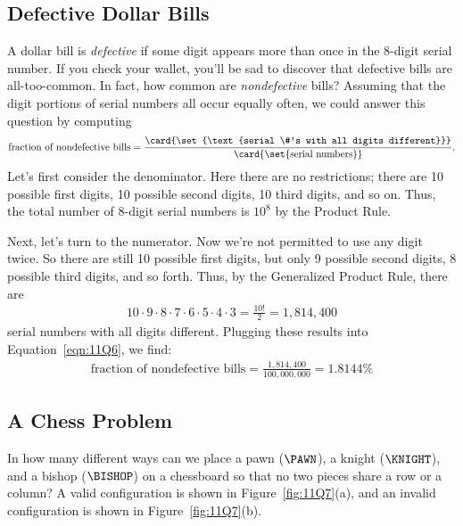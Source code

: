 \subsection{Defective Dollar Bills}

A dollar bill is \emph{defective} if some digit appears
more than once in the 8-digit serial number.  If you check your
wallet, you'll be sad to discover that defective bills are
all-too-common.  In fact, how common are \emph{nondefective} bills?
Assuming that the digit portions of serial numbers all occur equally
often, we could answer this question by computing
%
\begin{equation}\label{eqn:11Q6}
\text{fraction of nondefective bills}
     = \frac{ \card{\set{\text{serial \#'s with all digits different}}} }
             { \card{\set{\text{serial numbers}}} }.
\end{equation}
%
Let's first consider the denominator.  Here there are no restrictions;
there are 10 possible first digits, 10 possible second digits, 10
third digits, and so on.  Thus, the total number of 8-digit serial
numbers is $10^8$ by the Product Rule.

Next, let's turn to the numerator.  Now we're not permitted to use any
digit twice.  So there are still 10 possible first digits, but only 9
possible second digits, 8 possible third digits, and so forth.  Thus, by
the Generalized Product Rule, there are
%
\begin{align*}
10 \cdot 9 \cdot 8 \cdot 7 \cdot 6 \cdot 5 \cdot 4 \cdot 3
     = \frac{10!}{2} %
     = 1{,}814{,}400
\end{align*}
%
serial numbers with all digits different.  Plugging these results into
Equation~\ref{eqn:11Q6}, we find:
%
\begin{align*}
\text{fraction of nondefective bills}
     = \frac{1{,}814{,}400}{100{,}000{,}000} %
     = 1.8144\%
\end{align*}

\subsection{A Chess Problem}

In how many different ways can we place a pawn ($\PAWN$), a knight
($\KNIGHT$), and a bishop ($\BISHOP$) on a chessboard so that no two
pieces share a row or a column?  A valid configuration is shown in
Figure~\ref{fig:11Q7}(a), and an invalid configuration is shown in
Figure~\ref{fig:11Q7}(b).

